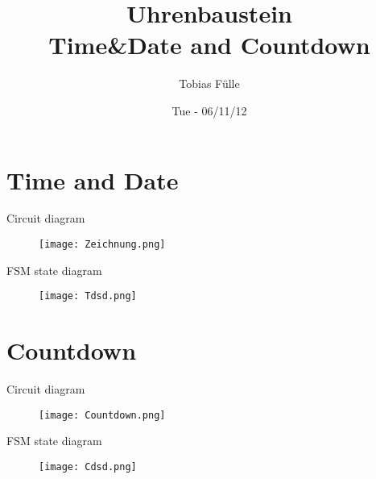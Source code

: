 \documentclass{beamer}
\title[Title of presentation]{Uhrenbaustein\\
{\small Time&Date and Countdown}
}
\author[author name]
{Tobias F{\"u}lle}
\institute[Fnord GmbH]{Lehrstuhl f{\"u}r integrierte Systeme}
\date{Tue - 06/11/12}
\begin{document}
%

\section{Time and Date}



  \begin{frame}{Circuit diagram}  
  	\begin{figure}
  		\centering
  		\texttt{[image: Zeichnung.png]}
  	\end{figure}
  \end{frame}

  \begin{frame}{FSM  state diagram}
  	\begin{figure}
    	\texttt{[image: Tdsd.png]}
    \end{figure}
  \end{frame}

\section{Countdown}

  \begin{frame}{Circuit diagram}
  	\begin{figure}
  		\texttt{[image: Countdown.png]}
  	\end{figure}
  \end{frame}

  \begin{frame}{FSM  state diagram}
  	\begin{figure}
   		\texttt{[image: Cdsd.png]}
    \end{figure}
  \end{frame}
%  
\end{document}
